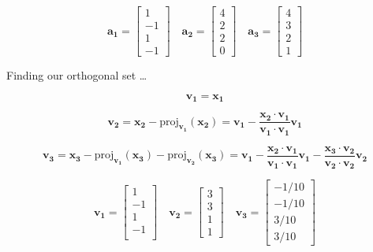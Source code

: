 \documentclass{article}
\begin{document}
\[%
    \mathbf{a_1}
    =
    \begin{bmatrix}1\\-1\\1\\-1\end{bmatrix}
    \quad
    \mathbf{a_2}
    =
    \begin{bmatrix}4\\2\\2\\0\end{bmatrix}
    \quad
    \mathbf{a_3}
    =
    \begin{bmatrix}4\\3\\2\\1\end{bmatrix}
\]%

Finding our orthogonal set \ldots


\[%
    \mathbf{v_1}
    =
    \mathbf{x_1}
\]%

\[%
    \mathbf{v_2}
    =
    \mathbf{x_2}
    -
    \text{proj}_{\mathbf{v_1}}\left(\mathbf{x_2}\right)
    =
    \mathbf{v_1}
    -
    \frac{\mathbf{x_2}\cdot \mathbf{v_1}}{\mathbf{v_1}\cdot \mathbf{v_1}} \mathbf{v_1}
\]%

\[%
    \mathbf{v_3}
    =
    \mathbf{x_3}
    -
    \text{proj}_{\mathbf{v_1}}\left(\mathbf{x_3}\right)
    -
    \text{proj}_{\mathbf{v_2}}\left(\mathbf{x_3}\right)
    =
    \mathbf{v_1}
    -
    \frac{\mathbf{x_2}\cdot \mathbf{v_1}}{\mathbf{v_1}\cdot
    \mathbf{v_1}}\mathbf{v_1}
    -
    \frac{\mathbf{x_3}\cdot \mathbf{v_2}}{\mathbf{v_2}\cdot \mathbf{v_2}}\mathbf{v_2}
\]%

\[%
    \mathbf{v_1}
    =
    \begin{bmatrix}1\\-1\\1\\-1\\\end{bmatrix}
    \quad
    \mathbf{v_2}
    =
    \begin{bmatrix}3\\3\\1\\1\end{bmatrix}
    \quad
    \mathbf{v_3}
    =
    \begin{bmatrix}-{1}/{10} \\-{1}/{10} \\{3}/{10} \\{3}/{10} \end{bmatrix}
\]%
\end{document}
